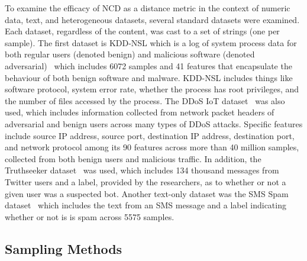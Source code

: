 \documentclass[preprint,12pt]{elsarticle}
\begin{document}
To examine the efficacy of NCD as a distance metric in the context of numeric data, text, and heterogeneous datasets, several standard datasets were examined.
Each dataset, regardless of the content, was cast to a set of strings (one per sample).
The first dataset is KDD-NSL which is a log of system process data for both regular users (denoted benign) and malicious software (denoted adversarial)~\cite{kddnsl} which includes 6072 samples and 41 features that encapsulate the behaviour of both benign software and malware.
KDD-NSL includes things like software protocol, system error rate, whether the process has root privileges, and the number of files accessed by the process.
The DDoS IoT dataset~\cite{ddos} was also used, which includes information collected from network packet headers of adversarial and benign users across many types of DDoS attacks.
Specific features include source IP address, source port, destination IP address, destination port, and network protocol among its 90 features across more than 40 million samples, collected from both benign users and malicious traffic.
In addition, the Truthseeker dataset~\cite{truthseeker} was used, which includes 134 thousand messages from Twitter users and a label, provided by the researchers, as to whether or not a given user was a suspected bot.
Another text-only dataset was the SMS Spam dataset~\cite{sms_spam} which includes the text from an SMS message and a label indicating whether or not is is spam across 5575 samples.



\subsection{Sampling Methods}
\end{document}
